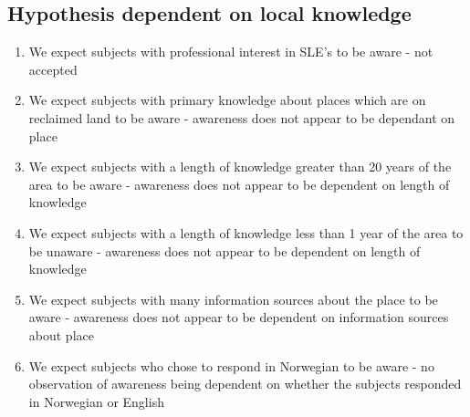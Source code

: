 \subsection{Hypothesis dependent on local knowledge}
\begin{enumerate}
    \item We expect subjects with professional interest in SLE's to be aware - not accepted
    \item We expect subjects with primary knowledge about places which are on reclaimed land to be aware - awareness does not appear to be dependant on place
    \item We expect subjects with a length of knowledge greater than 20 years of the area to be aware -  awareness does not appear to be dependent on length of knowledge
    \item We expect subjects with a length of knowledge less than 1 year of the area to be unaware -   awareness does not appear to be dependent on length of knowledge
    \item We expect subjects with many information sources about the place to be aware - awareness does not appear to be dependent on information sources about place
    \item We expect subjects who chose to respond in Norwegian to be aware - no observation of awareness being dependent on whether the subjects responded in Norwegian or English
\end{enumerate}
\paragraph{}

